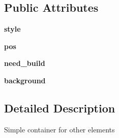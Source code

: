 \subsection*{\-Public \-Attributes}
\begin{DoxyCompactItemize}
\item 
\hypertarget{classinterface_1_1gui_1_1gui__elements_1_1_container_a4f92b7a3f7c58f0dcec9e439311ca459}{{\bfseries style}}\label{classinterface_1_1gui_1_1gui__elements_1_1_container_a4f92b7a3f7c58f0dcec9e439311ca459}

\item 
\hypertarget{classinterface_1_1gui_1_1gui__elements_1_1_container_ac9be29771d68866f70a389160f86733e}{{\bfseries pos}}\label{classinterface_1_1gui_1_1gui__elements_1_1_container_ac9be29771d68866f70a389160f86733e}

\item 
\hypertarget{classinterface_1_1gui_1_1gui__elements_1_1_container_a542303483ac34c34a82e1e48861a37db}{{\bfseries need\-\_\-build}}\label{classinterface_1_1gui_1_1gui__elements_1_1_container_a542303483ac34c34a82e1e48861a37db}

\item 
\hypertarget{classinterface_1_1gui_1_1gui__elements_1_1_container_a1371501cbf76e541b4edb95d5327c2e6}{{\bfseries background}}\label{classinterface_1_1gui_1_1gui__elements_1_1_container_a1371501cbf76e541b4edb95d5327c2e6}

\end{DoxyCompactItemize}


\subsection{\-Detailed \-Description}
\begin{DoxyVerb}Simple container for other elements \end{DoxyVerb}
 

